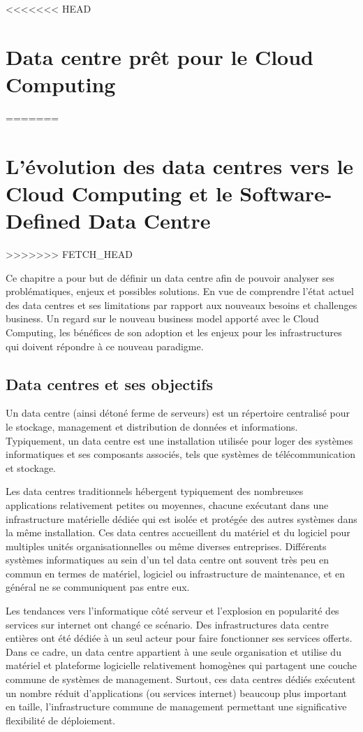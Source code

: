 <<<<<<< HEAD
\chapter{Data centre prêt pour le Cloud Computing}
=======
\chapter{L'évolution des data centres vers le Cloud Computing et le Software-Defined Data Centre}
>>>>>>> FETCH_HEAD
\label{chap-1}

Ce chapitre a pour but de définir un data centre afin de pouvoir analyser ses problématiques, enjeux et possibles solutions. En vue de comprendre l'état actuel des data centres et ses limitations par rapport aux nouveaux besoins et challenges business. Un regard sur le nouveau business model apporté avec le Cloud Computing, les bénéfices de son adoption et les enjeux pour les infrastructures qui doivent répondre à ce nouveau paradigme.

\section{Data centres et ses objectifs}

Un data centre (ainsi détoné ferme de serveurs) est un répertoire centralisé pour le stockage, management et distribution de données et informations. Typiquement, un data centre est une installation utilisée pour loger des systèmes informatiques et ses composants associés, tels que systèmes de télécommunication et stockage. \cite{understandingCloudWhatDC}

Les data centres traditionnels hébergent typiquement des nombreuses applications relativement petites ou moyennes, chacune exécutant dans une infrastructure matérielle dédiée qui est isolée et protégée des autres systèmes dans la même installation. Ces data centres accueillent du matériel et du logiciel pour multiples unités organisationnelles ou même diverses entreprises. Différents systèmes informatiques au sein d'un tel data centre ont souvent très peu en commun en termes de matériel, logiciel ou infrastructure de maintenance, et en général ne se communiquent pas entre eux. 


Les tendances vers l'informatique côté serveur et l'explosion en popularité des services sur internet ont changé ce scénario. Des infrastructures data centre entières ont été dédiée à un seul acteur pour faire fonctionner ses services offerts. Dans ce cadre, un data centre appartient à une seule organisation et utilise du matériel et plateforme logicielle relativement homogènes qui partagent une couche commune de systèmes de management. Surtout, ces data centres dédiés exécutent un nombre réduit d'applications (ou services internet) beaucoup plus important en taille, l'infrastructure commune de management permettant une significative flexibilité de déploiement. 

